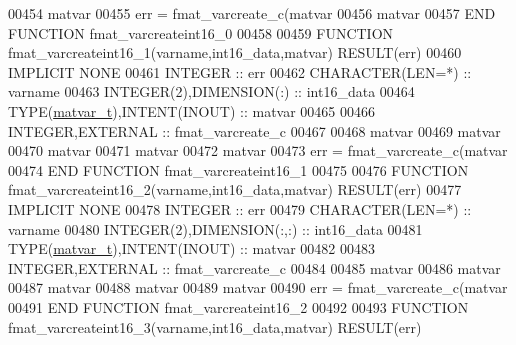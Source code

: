\begin{DoxyCode}
00454     matvar%
00455     err = fmat\_varcreate\_c(matvar%
00456                            matvar%
00457 \textcolor{keyword}{END FUNCTION }fmat\_varcreateint16\_0
00458 
00459 \textcolor{keyword}{FUNCTION }fmat\_varcreateint16\_1(varname,int16\_data,matvar) \textcolor{keyword}{RESULT}(err)
00460 \textcolor{keywordtype}{IMPLICIT NONE}
00461     \textcolor{keywordtype}{INTEGER}                         :: err
00462     \textcolor{keywordtype}{CHARACTER(LEN=*)}                :: varname
00463     \textcolor{keywordtype}{INTEGER(2)},\textcolor{keywordtype}{DIMENSION(:)}   :: int16\_data
00464     \textcolor{keywordtype}{TYPE}(\hyperlink{group___m_a_t_structmatvar__t}{matvar\_t}),\textcolor{keywordtype}{INTENT(INOUT)}    :: matvar
00465 
00466     \textcolor{keywordtype}{INTEGER},\textcolor{keywordtype}{EXTERNAL}                :: fmat\_varcreate\_c
00467 
00468     matvar%
00469     matvar%
00470     matvar%
00471     matvar%
00472     matvar%
00473     err = fmat\_varcreate\_c(matvar%
00474 \textcolor{keyword}{END FUNCTION }fmat\_varcreateint16\_1
00475 
00476 \textcolor{keyword}{FUNCTION }fmat\_varcreateint16\_2(varname,int16\_data,matvar) \textcolor{keyword}{RESULT}(err)
00477 \textcolor{keywordtype}{IMPLICIT NONE}
00478     \textcolor{keywordtype}{INTEGER}                         :: err
00479     \textcolor{keywordtype}{CHARACTER(LEN=*)}                :: varname
00480     \textcolor{keywordtype}{INTEGER(2)},\textcolor{keywordtype}{DIMENSION(:,:)} :: int16\_data
00481     \textcolor{keywordtype}{TYPE}(\hyperlink{group___m_a_t_structmatvar__t}{matvar\_t}),\textcolor{keywordtype}{INTENT(INOUT)}    :: matvar
00482 
00483     \textcolor{keywordtype}{INTEGER},\textcolor{keywordtype}{EXTERNAL}                :: fmat\_varcreate\_c
00484 
00485     matvar%
00486     matvar%
00487     matvar%
00488     matvar%
00489     matvar%
00490     err = fmat\_varcreate\_c(matvar%
00491 \textcolor{keyword}{END FUNCTION }fmat\_varcreateint16\_2
00492 
00493 \textcolor{keyword}{FUNCTION }fmat\_varcreateint16\_3(varname,int16\_data,matvar) \textcolor{keyword}{RESULT}(err)

\end{DoxyCode}
